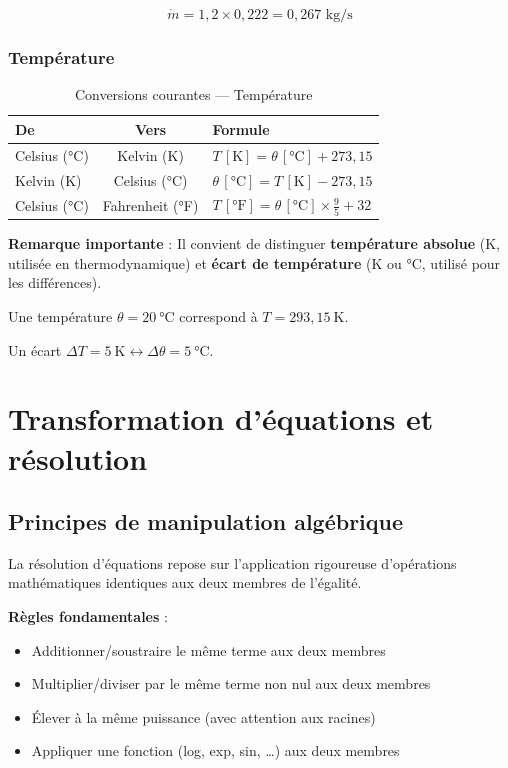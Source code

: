 \[
  \dot{m} = 1{,}2 \times 0{,}222 = 0{,}267 \text{ kg/s}
\]

\subsubsection{Température}

\begin{table}[h]
  \centering
  \sffamily\small
  \caption{Conversions courantes — Température}
  \label{tab:conv-temp}
  \begin{tabular}{|l|c|l|}
    \hline
    \textbf{De} & \textbf{Vers} & \textbf{Formule} \\
    \hline
    Celsius (°C) & Kelvin (K) & $T\,[\mathrm{K}] = \theta\,[\mathrm{°C}] + 273{,}15$ \\
    Kelvin (K) & Celsius (°C) & $\theta\,[\mathrm{°C}] = T\,[\mathrm{K}] - 273{,}15$ \\
    Celsius (°C) & Fahrenheit (°F) & $T\,[\mathrm{°F}] = \theta\,[\mathrm{°C}] \times \frac{9}{5} + 32$ \\
    \hline
  \end{tabular}
\end{table}

\textbf{Remarque importante} : Il convient de distinguer \textbf{température absolue} (K, utilisée
en thermodynamique) et \textbf{écart de température} (K ou °C, utilisé pour les différences).

Une température $\theta = 20~\mathrm{°C}$ correspond à $T = 293{,}15~\mathrm{K}$.

Un écart $\Delta T = 5~\mathrm{K} \leftrightarrow \Delta \theta = 5~\mathrm{°C}$.

\section{Transformation d'équations et résolution}

\subsection{Principes de manipulation algébrique}

La résolution d'équations repose sur l'application rigoureuse d'opérations mathématiques
identiques aux deux membres de l'égalité.

\textbf{Règles fondamentales} :
\begin{itemize}
  \item Additionner/soustraire le même terme aux deux membres
  \item Multiplier/diviser par le même terme non nul aux deux membres
  \item Élever à la même puissance (avec attention aux racines)
  \item Appliquer une fonction (log, exp, sin, …) aux deux membres
\end{itemize}

